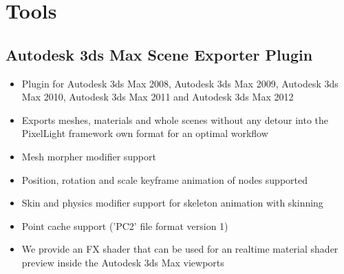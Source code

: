 \chapter{Tools}




\section{Autodesk 3ds Max Scene Exporter Plugin}
\begin{itemize}
\item{Plugin for Autodesk 3ds Max 2008, Autodesk 3ds Max 2009, Autodesk 3ds Max 2010, Autodesk 3ds Max 2011 and Autodesk 3ds Max 2012}
\item{Exports meshes, materials and whole scenes without any detour into the PixelLight framework own format for an optimal workflow}
\item{Mesh morpher modifier support}
\item{Position, rotation and scale keyframe animation of nodes supported}
\item{Skin and physics modifier support for skeleton animation with skinning}
\item{Point cache support ('PC2' file format version 1)}
\item{We provide an FX shader that can be used for an realtime material shader preview inside the Autodesk 3ds Max viewports}
\end{itemize}
